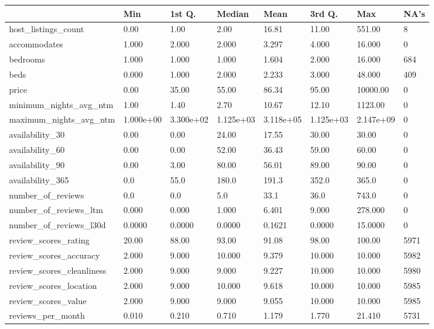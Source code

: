
\begin{tabular}[t]{llllllll}
\toprule
  & Min & 1st Q. & Median & Mean & 3rd Q. & Max & NA's\\
\midrule
host\_listings\_count & 0.00 & 1.00 & 2.00 & 16.81 & 11.00 & 551.00 & 8\\
accommodates & 1.000 & 2.000 & 2.000 & 3.297 & 4.000 & 16.000 & 0\\
bedrooms & 1.000 & 1.000 & 1.000 & 1.604 & 2.000 & 16.000 & 684\\
beds & 0.000 & 1.000 & 2.000 & 2.233 & 3.000 & 48.000 & 409\\
price & 0.00 & 35.00 & 55.00 & 86.34 & 95.00 & 10000.00 & 0\\
\addlinespace
minimum\_nights\_avg\_ntm & 1.00 & 1.40 & 2.70 & 10.67 & 12.10 & 1123.00 & 0\\
maximum\_nights\_avg\_ntm & 1.000e+00 & 3.300e+02 & 1.125e+03 & 3.118e+05 & 1.125e+03 & 2.147e+09 & 0\\
availability\_30 & 0.00 & 0.00 & 24.00 & 17.55 & 30.00 & 30.00 & 0\\
availability\_60 & 0.00 & 0.00 & 52.00 & 36.43 & 59.00 & 60.00 & 0\\
availability\_90 & 0.00 & 3.00 & 80.00 & 56.01 & 89.00 & 90.00 & 0\\
\addlinespace
availability\_365 & 0.0 & 55.0 & 180.0 & 191.3 & 352.0 & 365.0 & 0\\
number\_of\_reviews & 0.0 & 0.0 & 5.0 & 33.1 & 36.0 & 743.0 & 0\\
number\_of\_reviews\_ltm & 0.000 & 0.000 & 1.000 & 6.401 & 9.000 & 278.000 & 0\\
number\_of\_reviews\_l30d & 0.0000 & 0.0000 & 0.0000 & 0.1621 & 0.0000 & 15.0000 & 0\\
review\_scores\_rating & 20.00 & 88.00 & 93.00 & 91.08 & 98.00 & 100.00 & 5971\\
\addlinespace
review\_scores\_accuracy & 2.000 & 9.000 & 10.000 & 9.379 & 10.000 & 10.000 & 5982\\
review\_scores\_cleanliness & 2.000 & 9.000 & 9.000 & 9.227 & 10.000 & 10.000 & 5980\\
review\_scores\_location & 2.000 & 9.000 & 10.000 & 9.618 & 10.000 & 10.000 & 5985\\
review\_scores\_value & 2.000 & 9.000 & 9.000 & 9.055 & 10.000 & 10.000 & 5985\\
reviews\_per\_month & 0.010 & 0.210 & 0.710 & 1.179 & 1.770 & 21.410 & 5731\\
\bottomrule
\end{tabular}